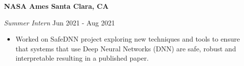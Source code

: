 \textbf{NASA Ames \hfill Santa Clara, CA}\par
\textit{Summer Intern} \hfill Jun 2021 - Aug 2021
\begin{itemize}
	\item Worked on SafeDNN project exploring new techniques and tools to ensure that systems that use Deep Neural Networks (DNN) are safe, robust and interpretable resulting in a published paper.
\end{itemize}\par
